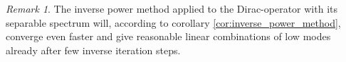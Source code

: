 \documentclass{article}
\theoremstyle{plain} %
\newtheorem{theorem}{Theorem}[section]
\theoremstyle{convention} %
\theoremstyle{remark} %
\newtheorem*{remark}{Remark} %
\numberwithin{equation}{section}
\begin{document}
\begin{appendix}
\begin{remark}
  The inverse power method applied to the Dirac-operator with its separable spectrum will, according to corollary \ref{cor:inverse_power_method}, converge even faster and give reasonable linear combinations of low modes already after few inverse iteration steps.
\end{remark}

\end{appendix}
\end{document}
